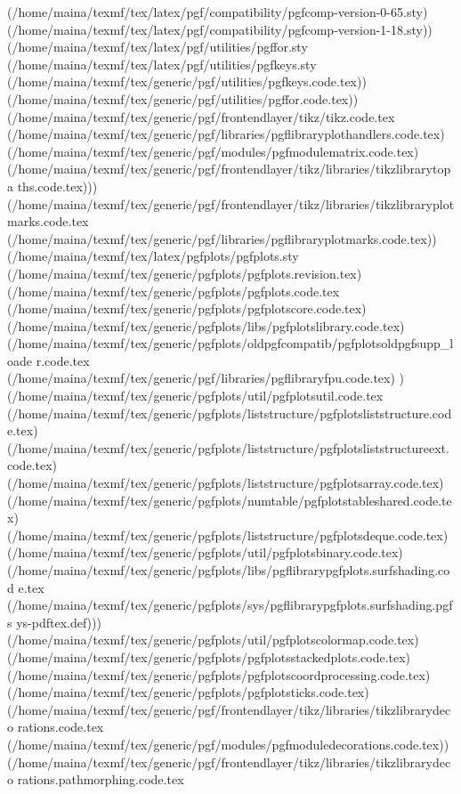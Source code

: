 (/home/maina/texmf/tex/latex/pgf/compatibility/pgfcomp-version-0-65.sty)
(/home/maina/texmf/tex/latex/pgf/compatibility/pgfcomp-version-1-18.sty))
(/home/maina/texmf/tex/latex/pgf/utilities/pgffor.sty
(/home/maina/texmf/tex/latex/pgf/utilities/pgfkeys.sty
(/home/maina/texmf/tex/generic/pgf/utilities/pgfkeys.code.tex))
(/home/maina/texmf/tex/generic/pgf/utilities/pgffor.code.tex))
(/home/maina/texmf/tex/generic/pgf/frontendlayer/tikz/tikz.code.tex
(/home/maina/texmf/tex/generic/pgf/libraries/pgflibraryplothandlers.code.tex)
(/home/maina/texmf/tex/generic/pgf/modules/pgfmodulematrix.code.tex)
(/home/maina/texmf/tex/generic/pgf/frontendlayer/tikz/libraries/tikzlibrarytopa
ths.code.tex)))
(/home/maina/texmf/tex/generic/pgf/frontendlayer/tikz/libraries/tikzlibraryplot
marks.code.tex
(/home/maina/texmf/tex/generic/pgf/libraries/pgflibraryplotmarks.code.tex))
(/home/maina/texmf/tex/latex/pgfplots/pgfplots.sty
(/home/maina/texmf/tex/generic/pgfplots/pgfplots.revision.tex)
(/home/maina/texmf/tex/generic/pgfplots/pgfplots.code.tex
(/home/maina/texmf/tex/generic/pgfplots/pgfplotscore.code.tex)
(/home/maina/texmf/tex/generic/pgfplots/libs/pgfplotslibrary.code.tex)
(/home/maina/texmf/tex/generic/pgfplots/oldpgfcompatib/pgfplotsoldpgfsupp_loade
r.code.tex (/home/maina/texmf/tex/generic/pgf/libraries/pgflibraryfpu.code.tex)
) (/home/maina/texmf/tex/generic/pgfplots/util/pgfplotsutil.code.tex
(/home/maina/texmf/tex/generic/pgfplots/liststructure/pgfplotsliststructure.cod
e.tex)
(/home/maina/texmf/tex/generic/pgfplots/liststructure/pgfplotsliststructureext.
code.tex)
(/home/maina/texmf/tex/generic/pgfplots/liststructure/pgfplotsarray.code.tex)
(/home/maina/texmf/tex/generic/pgfplots/numtable/pgfplotstableshared.code.tex)
(/home/maina/texmf/tex/generic/pgfplots/liststructure/pgfplotsdeque.code.tex)
(/home/maina/texmf/tex/generic/pgfplots/util/pgfplotsbinary.code.tex)
(/home/maina/texmf/tex/generic/pgfplots/libs/pgflibrarypgfplots.surfshading.cod
e.tex
(/home/maina/texmf/tex/generic/pgfplots/sys/pgflibrarypgfplots.surfshading.pgfs
ys-pdftex.def)))
(/home/maina/texmf/tex/generic/pgfplots/util/pgfplotscolormap.code.tex)
(/home/maina/texmf/tex/generic/pgfplots/pgfplotsstackedplots.code.tex)
(/home/maina/texmf/tex/generic/pgfplots/pgfplotscoordprocessing.code.tex)
(/home/maina/texmf/tex/generic/pgfplots/pgfplotsticks.code.tex)
(/home/maina/texmf/tex/generic/pgf/frontendlayer/tikz/libraries/tikzlibrarydeco
rations.code.tex
(/home/maina/texmf/tex/generic/pgf/modules/pgfmoduledecorations.code.tex))
(/home/maina/texmf/tex/generic/pgf/frontendlayer/tikz/libraries/tikzlibrarydeco
rations.pathmorphing.code.tex
